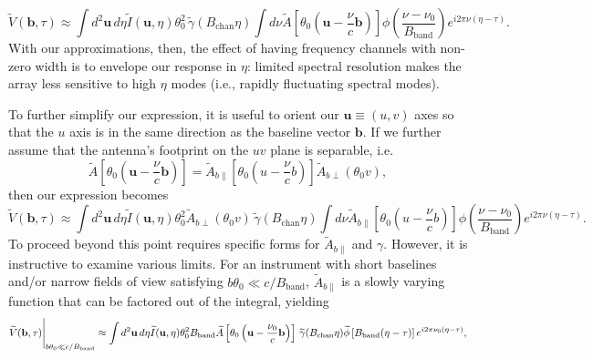 \documentclass[twocolumn,aps,prd,nofootinbib,showpacs]{revtex4-1}
\begin{document}
\begin{widetext}
\begin{equation}
\label{eq:genVtilde}
\widetilde{V} (\mathbf{b}, \tau) \approx  \int d^2\mathbf{u} \, d\eta \widetilde{I} (\mathbf{u}, \eta) \theta_0^2  \,\widetilde{\gamma}(B_\textrm{chan} \eta) \int d\nu  \widetilde{A} \left[ \theta_0 \left( \mathbf{u} - \frac{\nu}{c} \mathbf{b} \right) \right] \phi \left( \frac{\nu - \nu_0}{B_\textrm{band}} \right) e^{i 2 \pi \nu (\eta - \tau)}.
\end{equation}
With our approximations, then, the effect of having frequency channels with non-zero width is to envelope our response in $\eta$: limited spectral resolution makes the array less sensitive to high $\eta$ modes (i.e., rapidly fluctuating spectral modes).

To further simplify our expression, it is useful to orient our $\mathbf{u} \equiv (u,v)$ axes so that the $u$ axis is in the same direction as the baseline vector $\mathbf{b}$.  If we further assume that the antenna's footprint on the $uv$ plane is separable, i.e.
\begin{equation}
\label{eq:SepPrimaryBeam}
\widetilde{A} \left[ \theta_0 \left( \mathbf{u} - \frac{\nu}{c} \mathbf{b} \right) \right] = \widetilde{A}_{b\parallel} \left[ \theta_0 \left( u - \frac{\nu}{c} b \right) \right] \widetilde{A}_{b\perp} (\theta_0 v),
\end{equation}
then our expression becomes
\begin{equation}
\label{eq:vIntegratedGenVtilde}
\widetilde{V} (\mathbf{b}, \tau) \approx  \int d^2\mathbf{u} \, d\eta \widetilde{I} (\mathbf{u}, \eta) \theta_0^2  \widetilde{A}_{b\perp} (\theta_0 v) \,\widetilde{\gamma}(B_\textrm{chan} \eta) \int d\nu \widetilde{A}_{b\parallel} \left[ \theta_0 \left( u - \frac{\nu}{c} b \right) \right] \phi \left( \frac{\nu - \nu_0}{B_\textrm{band}} \right) e^{i 2 \pi \nu (\eta - \tau)}.
\end{equation}
To proceed beyond this point requires specific forms for $\widetilde{A}_{b\parallel}$ and $\gamma$.  However, it is instructive to examine various limits.  For an instrument with short baselines and/or narrow fields of view satisfying $b\theta_0 \ll c/B_\textrm{band} $, $\widetilde{A}_{b\parallel}$ is a slowly varying function that can be factored out of the integral, yielding
\begin{equation}
\label{eq:shortBlVtilde}
\widetilde{V} (\mathbf{b}, \tau) \Bigg{|}_{b\theta_0 \ll c/B_\textrm{band}} \approx \int d^2\mathbf{u} \, d\eta \widetilde{I} (\mathbf{u}, \eta) \theta_0^2 B_\textrm{band} \widetilde{A} \left[ \theta_0 \left( \mathbf{u} - \frac{\nu_0}{c} \mathbf{b} \right) \right] \,\widetilde{\gamma}(B_\textrm{chan} \eta)  \widetilde{\phi} \left[ B_\textrm{band} (\eta - \tau) \right] e^{i 2\pi \nu_0 (\eta - \tau)},

\end{equation}
\end{widetext}
\end{document}
